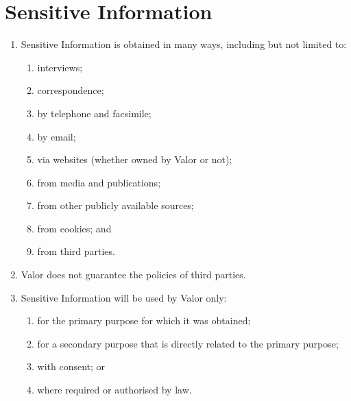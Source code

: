 \documentclass[10pt]{article}
\begin{document}
\section{Sensitive Information}
\begin{enumerate}[(1)]
\item
Sensitive Information is obtained in many ways, including but not limited to:
	\begin{enumerate}
	\item
	interviews;
	
	\item
	correspondence;
	
	\item
	by telephone and facsimile;
	
	\item
	by email;
	
	\item
	via websites (whether owned by Valor or not);
	
	\item
	from media and publications;
	
	\item
	from other publicly available sources;
	
	\item
	from cookies; and
	
	\item
	from third parties.
	\end{enumerate}

\item
Valor does not guarantee the policies of third parties.

\item
Sensitive Information will be used by Valor only:
	\begin{enumerate}
	\item
	for the primary purpose for which it was obtained;
	
	\item
	for a secondary purpose that is directly related to the primary purpose;
	
	\item
	with consent; or
	
	\item
	where required or authorised by law.
	\end{enumerate}
\end{enumerate}
\end{document}
